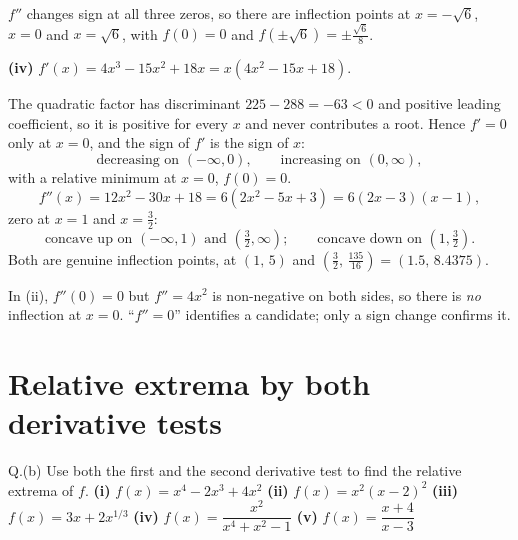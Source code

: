 \begin{solution}
$f''$ changes sign at all three zeros, so there are inflection points at
$x=-\sqrt6$, $x=0$ and $x=\sqrt6$, with
$f(0)=0$ and $f(\pm\sqrt6)=\pm\tfrac{\sqrt6}{8}$.

\medskip
\textbf{(iv)} $f'(x)=4x^{3}-15x^{2}+18x=x\left(4x^{2}-15x+18\right)$.

The quadratic factor has discriminant $225-288=-63<0$ and positive leading
coefficient, so it is positive for every $x$ and never contributes a root. Hence
$f'=0$ only at $x=0$, and the sign of $f'$ is the sign of $x$:
\[
\text{decreasing on }(-\infty,0),\qquad \text{increasing on }(0,\infty),
\]
with a relative minimum at $x=0$, $f(0)=0$.
\[
f''(x)=12x^{2}-30x+18=6\left(2x^{2}-5x+3\right)=6(2x-3)(x-1),
\]
zero at $x=1$ and $x=\tfrac32$:
\[
\text{concave up on }(-\infty,1)\text{ and }\left(\tfrac32,\infty\right);
\qquad
\text{concave down on }\left(1,\tfrac32\right).
\]
Both are genuine inflection points, at $(1,\,5)$ and
$\left(\tfrac32,\,\tfrac{135}{16}\right)=(1.5,\,8.4375)$.

\end{solution}

\begin{pitfall}
In (ii), $f''(0)=0$ but $f''=4x^{2}$ is non-negative on both sides, so there is
\emph{no} inflection at $x=0$. ``$f''=0$'' identifies a candidate; only a sign
change confirms it.
\end{pitfall}

\section{Relative extrema by both derivative tests}

\begin{question}{Q.(b)}
Use both the first and the second derivative test to find the relative extrema
of $f$.
\textbf{(i)} $f(x)=x^{4}-2x^{3}+4x^{2}$ \quad
\textbf{(ii)} $f(x)=x^{2}(x-2)^{2}$ \quad
\textbf{(iii)} $f(x)=3x+2x^{1/3}$ \quad
\textbf{(iv)} $f(x)=\dfrac{x^{2}}{x^{4}+x^{2}-1}$ \quad
\textbf{(v)} $f(x)=\dfrac{x+4}{x-3}$
\end{question}

